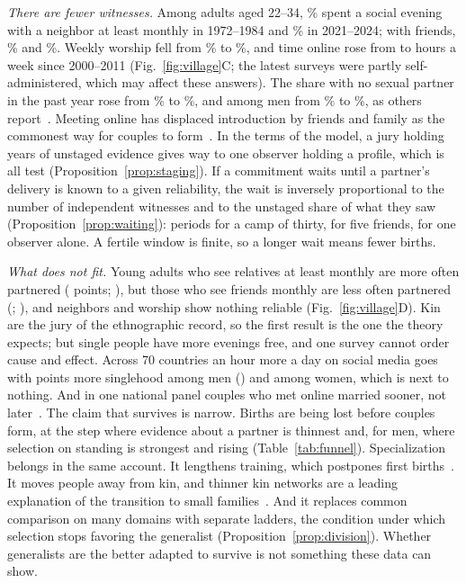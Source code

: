 \emph{There are fewer witnesses.} Among adults aged 22--34, \VgNeighOld\% spent a social evening with a neighbor at least
monthly in 1972--1984 and \VgNeighNew\% in 2021--2024; with friends, \VgFriOld\% and \VgFriNew\%. Weekly worship fell from
\VgWorOld\% to \VgWorNew\%, and time online rose from \VgOnlineOld{} to \VgOnlineNew{} hours a week since 2000--2011
(Fig.~\ref{fig:village}C; the latest surveys were partly self-administered, which may affect these answers). The share with
no sexual partner in the past year rose from \VgNoPartOld\% to \VgNoPartNew\%, and among men from \VgNoPartMOld\% to
\VgNoPartMNew\%, as others report~\cite{ueda2020,twenge2017,lei2021}. Meeting online has displaced introduction by friends
and family as the commonest way for couples to form~\cite{rosenfeld2019}. In the terms of the model, a jury holding years
of unstaged evidence gives way to one observer holding a profile, which is all test (Proposition~\ref{prop:staging}). If a
commitment waits until a partner's delivery is known to a given reliability, the wait is inversely proportional to the
number of independent witnesses and to the unstaged share of what they saw (Proposition~\ref{prop:waiting}): \NtWaitCamp{}
periods for a camp of thirty, \NtWaitFive{} for five friends, \NtWaitOne{} for one observer alone. A fertile window is
finite, so a longer wait means fewer births.

\emph{What does not fit.} Young adults who see relatives at least monthly are more often partnered (\VgAsRel{} points;
\VgAsRelCI), but those who see friends monthly are less often partnered (\VgAsFri; \VgAsFriCI), and neighbors and worship
show nothing reliable (Fig.~\ref{fig:village}D). Kin are the jury of the ethnographic record, so the first result is the
one the theory expects; but single people have more evenings free, and one survey cannot order cause and effect. Across 70
countries an hour more a day on social media goes with \WdScrM{} points more singlehood among men (\WdScrMCI) and
\WdScrW{} among women, which is next to nothing. And in one national panel couples who met online married sooner, not
later~\cite{rosenfeld2017}. The claim that survives is narrow. Births are being lost before couples form, at the step where
evidence about a partner is thinnest and, for men, where selection on standing is strongest and rising
(Table~\ref{tab:funnel}). Specialization belongs in the same account. It lengthens training, which postpones first
births~\cite{nibhrolchain2012}. It moves people away from kin, and thinner kin networks are a leading explanation of the
transition to small families~\cite{newson2005,sear2011,colleran2020}. And it replaces common comparison on many domains with
separate ladders, the condition under which selection stops favoring the generalist (Proposition~\ref{prop:division}).
Whether generalists are the better adapted to survive is not something these data can show.

